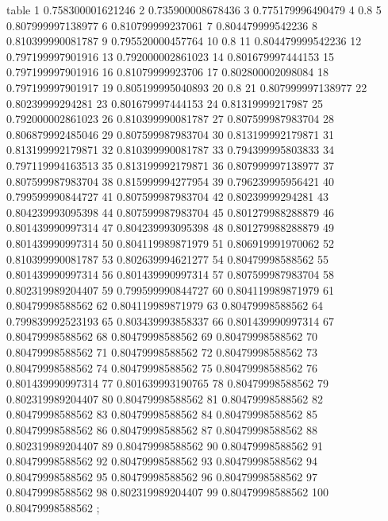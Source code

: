 table {%
	1 0.758300001621246
	2 0.735900008678436
	3 0.775179996490479
	4 0.8
	5 0.807999997138977
	6 0.810799999237061
	7 0.804479999542236
	8 0.810399990081787
	9 0.795520000457764
	10 0.8
	11 0.804479999542236
	12 0.797199997901916
	13 0.792000002861023
	14 0.801679997444153
	15 0.797199997901916
	16 0.81079999923706
	17 0.802800002098084
	18 0.797199997901917
	19 0.805199995040893
	20 0.8
	21 0.807999997138977
	22 0.80239999294281
	23 0.801679997444153
	24 0.81319999217987
	25 0.792000002861023
	26 0.810399990081787
	27 0.807599987983704
	28 0.806879992485046
	29 0.807599987983704
	30 0.813199992179871
	31 0.813199992179871
	32 0.810399990081787
	33 0.794399995803833
	34 0.797119994163513
	35 0.813199992179871
	36 0.807999997138977
	37 0.807599987983704
	38 0.815999994277954
	39 0.796239995956421
	40 0.799599990844727
	41 0.807599987983704
	42 0.80239999294281
	43 0.804239993095398
	44 0.807599987983704
	45 0.801279988288879
	46 0.801439990997314
	47 0.804239993095398
	48 0.801279988288879
	49 0.801439990997314
	50 0.804119989871979
	51 0.806919991970062
	52 0.810399990081787
	53 0.802639994621277
	54 0.80479998588562
	55 0.801439990997314
	56 0.801439990997314
	57 0.807599987983704
	58 0.802319989204407
	59 0.799599990844727
	60 0.804119989871979
	61 0.80479998588562
	62 0.804119989871979
	63 0.80479998588562
	64 0.799839992523193
	65 0.803439993858337
	66 0.801439990997314
	67 0.80479998588562
	68 0.80479998588562
	69 0.80479998588562
	70 0.80479998588562
	71 0.80479998588562
	72 0.80479998588562
	73 0.80479998588562
	74 0.80479998588562
	75 0.80479998588562
	76 0.801439990997314
	77 0.801639993190765
	78 0.80479998588562
	79 0.802319989204407
	80 0.80479998588562
	81 0.80479998588562
	82 0.80479998588562
	83 0.80479998588562
	84 0.80479998588562
	85 0.80479998588562
	86 0.80479998588562
	87 0.80479998588562
	88 0.802319989204407
	89 0.80479998588562
	90 0.80479998588562
	91 0.80479998588562
	92 0.80479998588562
	93 0.80479998588562
	94 0.80479998588562
	95 0.80479998588562
	96 0.80479998588562
	97 0.80479998588562
	98 0.802319989204407
	99 0.80479998588562
	100 0.80479998588562
};
